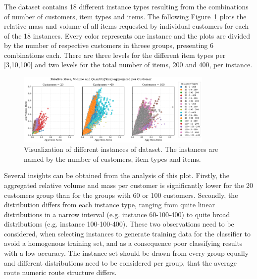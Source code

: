 \subsubsection{\krebsADataSetText}

The dataset contains 18 different instance types resulting from the combinations
of number of customers, item types and items. The following Figure~\ref{fig:krebs_dataset_analysis_detailes} plots
the relative mass and volume of all items requested by individual customers for each of the 18 instances. Every color
represents one instance and the plots are divided by the number of respective customers in threee groups, presenting
6 combinations each. There are three levels for the different item types per [3,10,100] and two levels for the total
number of items, 200 and 400, per instance.

\begin{figure}[ht]
  \centering
  \includegraphics[width=0.85\textwidth]{pictures/krebs_instances_detailed.png}
  \caption[Visualization of different instances of \textcite{krebs_advanced_2021} dataset.]{Visualization of different instances of \krebsADataSetText dataset.
    The instances are named by the number of customers, item types and items.}
  \label{fig:krebs_dataset_analysis_detailes}
\end{figure}

Several insights can be obtained from the analysis of this plot. Firstly, the aggregated relative
volume and mass per customer is significantly lower for the 20 customers group than for the groups with 60 or 100 customers.
Secondly, the distribution differs from each instance type, ranging from quite linear distributions in a narrow
interval (e.g. instance 60-100-400) to quite broad distributions (e.g. instance 100-100-400). These two observations need to be considered,
when selecting instances to generate training data for the classifier to avoid a homogenous training set, and
as a consequence poor classifying results with a low accuracy. The instance set should be drawn from every group equally and
different distributions need to be considered per group, that the average route numeric route structure differs.

